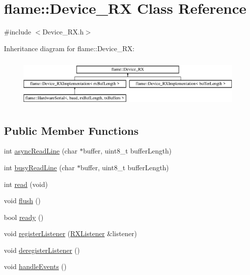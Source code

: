 \hypertarget{classflame_1_1_device___r_x}{\section{flame\-:\-:Device\-\_\-\-R\-X Class Reference}
\label{classflame_1_1_device___r_x}
}


{\ttfamily \#include $<$Device\-\_\-\-R\-X.\-h$>$}

Inheritance diagram for flame\-:\-:Device\-\_\-\-R\-X\-:\begin{figure}[H]
\begin{center}
\leavevmode
\includegraphics[height=2.492581cm]{classflame_1_1_device___r_x}
\end{center}
\end{figure}
\subsection*{Public Member Functions}
\begin{DoxyCompactItemize}
\item 
int \hyperlink{classflame_1_1_device___r_x_acde7b96e30210372ae171af28d86d610}{async\-Read\-Line} (char $\ast$buffer, uint8\-\_\-t buffer\-Length)
\item 
int \hyperlink{classflame_1_1_device___r_x_af0f6917beebe6609114a1738977c4be9}{busy\-Read\-Line} (char $\ast$buffer, uint8\-\_\-t buffer\-Length)
\item 
int \hyperlink{classflame_1_1_device___r_x_af3a4cdfdec25abf4a38262564b011111}{read} (void)
\item 
void \hyperlink{classflame_1_1_device___r_x_ae5d5e88a35c324c30adeff81a269b98f}{flush} ()
\item 
bool \hyperlink{classflame_1_1_device___r_x_ae435bb6015855ee87002c81e38fbb0bb}{ready} ()
\item 
void \hyperlink{classflame_1_1_device___r_x_ae14fc8bc11a268c60141a16b25736937}{register\-Listener} (\hyperlink{classflame_1_1_r_x_listener}{R\-X\-Listener} \&listener)
\item 
void \hyperlink{classflame_1_1_device___r_x_aceb1c29df27c6ab295abba2b29cff598}{deregister\-Listener} ()
\item 
void \hyperlink{classflame_1_1_device___r_x_a9b4e70f748a227c3681bd7386e2d37c1}{handle\-Events} ()
\end{DoxyCompactItemize}
